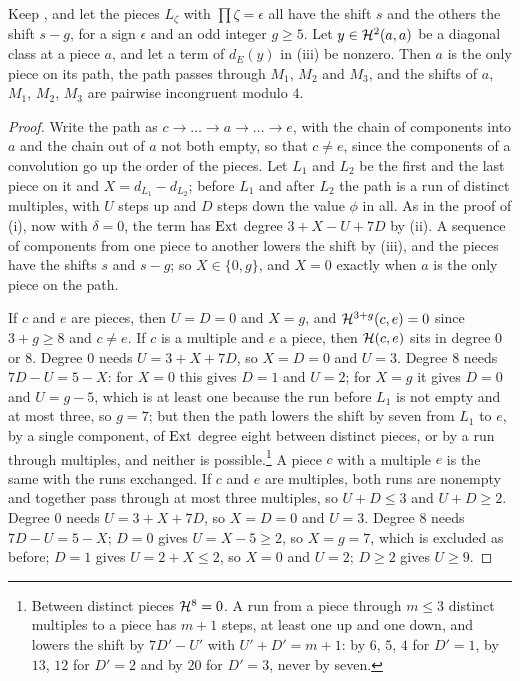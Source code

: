 \begin{lemma}\label{lem:efourlonely}
Keep , and let the pieces $L_{\zeta}$ with
$\prod\zeta=\epsilon$ all have the shift $s$ and the others the shift $s-g$,
for a sign $\epsilon$ and an odd integer $g\ge5$. Let $y\in\mathcal{H}^{2}(a,a)$ be
a diagonal class at a piece $a$, and let a term of $d_{E}(y)$ in
(iii) be nonzero. Then $a$ is the only piece on its
path, the path passes through $M_{1}$, $M_{2}$ and $M_{3}$, and the shifts
of $a$, $M_{1}$, $M_{2}$, $M_{3}$ are pairwise incongruent modulo $4$.
\end{lemma}

\begin{proof}
Write the path as $c\to\dots\to a\to\dots\to e$, with the chain of
components into $a$ and the chain out of $a$ not both empty, so that
$c\ne e$, since the components of a convolution go up the order of the
pieces. Let $L_{1}$ and $L_{2}$ be the first and the last piece on it and
$X=d_{L_{1}}-d_{L_{2}}$; before $L_{1}$ and after $L_{2}$ the path is a run
of distinct multiples, with $U$ steps up and $D$ steps down the value $\phi$
in all. As in the proof of (i), now with $\delta=0$,
the term has $\operatorname{Ext}$ degree $3+X-U+7D$ by (ii). A
sequence of components from one piece to another lowers the shift by
(iii), and the pieces have the shifts $s$ and $s-g$;
so $X\in\{0,g\}$, and $X=0$ exactly when $a$ is the only piece on the path.

If $c$ and $e$ are pieces, then $U=D=0$ and $X=g$, and $\mathcal{H}^{3+g}(c,e)=0$
since $3+g\ge8$ and $c\ne e$. If $c$ is a multiple and $e$ a piece, then
$\mathcal{H}(c,e)$ sits in degree $0$ or $8$. Degree $0$ needs $U=3+X+7D$, so
$X=D=0$ and $U=3$. Degree $8$ needs $7D-U=5-X$: for $X=0$ this gives $D=1$
and $U=2$; for $X=g$ it gives $D=0$ and $U=g-5$, which is at least one
because the run before $L_{1}$ is not empty and at most three, so $g=7$; but
then the path lowers the shift by seven from $L_{1}$ to $e$, by a single
component, of $\operatorname{Ext}$ degree eight between distinct pieces, or by a run
through multiples, and neither is possible.\footnote{Between distinct pieces
$\mathcal{H}^{8}=0$. A run from a piece through $m\le3$ distinct multiples to a piece
has $m+1$ steps, at least one up and one down, and lowers the shift by
$7D'-U'$ with $U'+D'=m+1$: by $6$, $5$, $4$ for $D'=1$, by $13$, $12$ for
$D'=2$ and by $20$ for $D'=3$, never by seven.} A piece $c$ with a multiple $e$ is the same
with the runs exchanged. If $c$ and $e$ are multiples, both runs are
nonempty and together pass through at most three multiples, so $U+D\le3$
and $U+D\ge2$. Degree $0$ needs $U=3+X+7D$, so $X=D=0$ and $U=3$. Degree $8$
needs $7D-U=5-X$; $D=0$ gives $U=X-5\ge2$, so $X=g=7$, which is excluded as
before; $D=1$ gives $U=2+X\le2$, so $X=0$ and $U=2$; $D\ge2$ gives $U\ge9$.


\end{proof}
